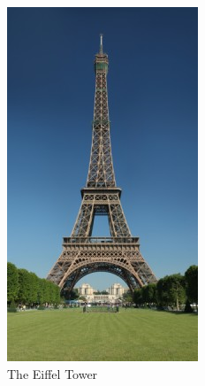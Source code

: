 \documentclass[12pt,final,twoside]{report}
\theoremstyle{plain}
\theoremstyle{definition}
\theoremstyle{remark}
\begin{document}
\begin{figure}[tbhp]
\begin{subfigure}[b]{.3\textwidth}
    \includegraphics[width=.7\textwidth]{tour_eiffel}
    \caption{The Eiffel Tower\footnotemark}
  \end{subfigure}
  ~
  \begin{subfigure}[b]{.3\textwidth}

\end{subfigure}
\end{figure}
\end{document}
